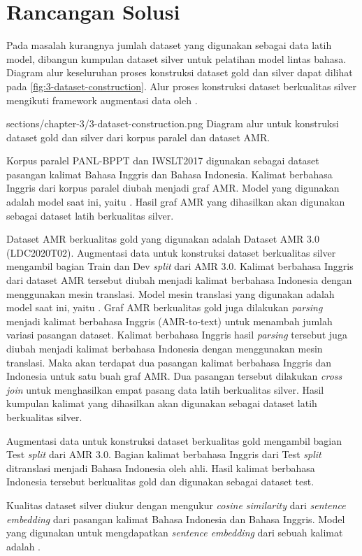 \section{Rancangan Solusi}

Pada masalah kurangnya jumlah dataset yang digunakan sebagai data latih model, dibangun kumpulan dataset silver untuk pelatihan model \amrparsing{} lintas bahasa.
Diagram alur keseluruhan proses konstruksi dataset gold dan silver dapat dilihat pada \cref{fig:3-dataset-construction}.
Alur proses konstruksi dataset berkualitas silver mengikuti framework augmentasi data oleh \textcite{lee2022}.

  {sections/chapter-3/3-dataset-construction.png}
  {Diagram alur untuk konstruksi dataset gold dan silver dari korpus paralel dan dataset AMR.}

Korpus paralel PANL-BPPT dan IWSLT2017 digunakan sebagai dataset pasangan kalimat Bahasa Inggris dan Bahasa Indonesia.
Kalimat berbahasa Inggris dari korpus paralel diubah menjadi graf \gls{AMR}.
Model \amrparsing{} yang digunakan adalah model \sota{} saat ini, yaitu .
Hasil graf \gls{AMR} yang dihasilkan akan digunakan sebagai dataset latih berkualitas silver.

Dataset \gls{AMR} berkualitas gold yang digunakan adalah Dataset AMR 3.0 (LDC2020T02).
Augmentasi data untuk konstruksi dataset berkualitas silver mengambil bagian Train dan Dev \textit{split} dari AMR 3.0.
Kalimat berbahasa Inggris dari dataset \gls{AMR} tersebut diubah menjadi kalimat berbahasa Indonesia dengan menggunakan mesin translasi.
Model mesin translasi yang digunakan adalah model \sota{} saat ini, yaitu .
Graf \gls{AMR} berkualitas gold juga dilakukan \textit{parsing} menjadi kalimat berbahasa Inggris (AMR-to-text) untuk menambah jumlah variasi pasangan dataset.
Kalimat berbahasa Inggris hasil \textit{parsing} tersebut juga diubah menjadi kalimat berbahasa Indonesia dengan menggunakan mesin translasi.
Maka akan terdapat dua pasangan kalimat berbahasa Inggris dan Indonesia untuk satu buah graf \gls{AMR}.
Dua pasangan tersebut dilakukan \textit{cross join} untuk menghasilkan empat pasang data latih berkualitas silver.
Hasil kumpulan kalimat yang dihasilkan akan digunakan sebagai dataset latih berkualitas silver.

Augmentasi data untuk konstruksi dataset berkualitas gold mengambil bagian Test \textit{split} dari AMR 3.0.
Bagian kalimat berbahasa Inggris dari Test \textit{split} ditranslasi menjadi Bahasa Indonesia oleh ahli.
Hasil kalimat berbahasa Indonesia tersebut berkualitas gold dan digunakan sebagai dataset test.

Kualitas dataset silver diukur dengan mengukur \textit{cosine similarity} dari \multil{} \textit{sentence embedding} dari pasangan kalimat Bahasa Indonesia dan Bahasa Inggris.
Model \mwordem{} yang digunakan untuk mengdapatkan \multil{} \textit{sentence embedding} dari sebuah kalimat adalah .
